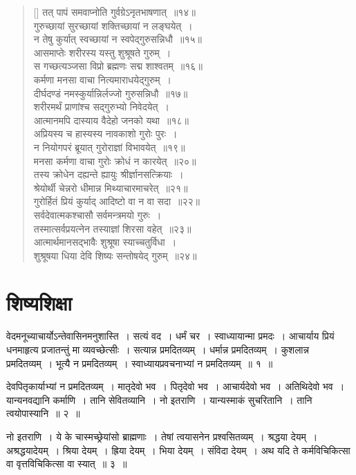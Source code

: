 \documentclass[twoside,12pt,notitlepage]{book}
\begin{document}
\begin{verse}[\versewidth]
तत् पापं समवाप्नोति गुर्वग्रेऽनृतभाषणात्~॥१४॥\\
गुरुच्छायां सुरच्छायां शक्तिच्छायां न लङ्घयेत्~।\\[-6pt]
न तेषु कुर्यात् स्वच्छायां न स्वपेद्गुरुसन्निधौ~॥१५॥\footA \\
आसमाप्तेः शरीरस्य यस्तु शुश्रूषते गुरुम्~।\\[-6pt]
स गच्छत्यञ्जसा विप्रो ब्रह्मणः सद्म शाश्वतम्~॥१६॥\\
कर्मणा मनसा वाचा नित्यमाराधयेद्गुरुम्~।\\[-6pt]
दीर्घदण्डं नमस्कुर्यान्निर्लज्जो गुरुसन्निधौ~॥१७॥\\
शरीरमर्थं प्राणांश्च सद्गुरुभ्यो निवेदयेत्~।\\[-6pt]
आत्मानमपि दास्याय वैदेहो जनको यथा~॥१८॥\\
अप्रियस्य च हास्यस्य नावकाशो गुरोः पुरः~।\\[-6pt]
न नियोगपरं ब्रूयात् गुरोराज्ञां विभावयेत्~॥१९॥\\
मनसा कर्मणा वाचा गुरोः क्रोधं न कारयेत्~॥२०॥\\
तस्य क्रोधेन दह्यन्ते ह्यायुः श्रीर्ज्ञानसत्क्रियाः~।\\[-6pt]
श्रेयोर्थी चेन्नरो धीमान्न मिथ्याचारमाचरेत्~॥२१॥\\
गुरोर्हितं प्रियं कुर्याद् आदिष्टो वा न वा सदा~॥२२॥\\
सर्वदेवात्मकश्चासौ सर्वमन्त्रमयो गुरुः~।\\[-6pt]
तस्मात्सर्वप्रयत्नेन तस्याज्ञां शिरसा वहेत्~॥२३॥\\
आत्मार्थमानसद्भावैः शुश्रूषा स्याच्चतुर्विधा~।\\[-6pt]
शुश्रूषया धिया देवि शिष्यः सन्तोषयेद् गुरुम्~॥२४॥\footA 
\end{verse}

\section{शिष्यशिक्षा}

वेदमनूच्याचार्योऽन्तेवासिनमनुशास्ति~। सत्यं वद~। धर्मं चर~। स्वाध्यायान्मा प्रमदः~। आचार्याय प्रियं धनमाहृत्य प्रजातन्तुं मा व्यवच्छेत्सीः~। सत्यान्न प्रमदितव्यम्~। धर्मान्न प्रमदितव्यम्~। कुशलान्न प्रमदितव्यम्~। भूत्यै न प्रमदितव्यम्~। स्वाध्यायप्रवचनाभ्यां न प्रमदितव्यम्~॥ १~॥ 

देवपितृकार्याभ्यां न प्रमदितव्यम्~। मातृदेवो भव~। पितृदेवो भव~। आचार्यदेवो भव~। अतिथिदेवो भव~। यान्यनवद्यानि कर्माणि~। तानि सेवितव्यानि~। नो इतराणि~। यान्यस्माकं सुचरितानि~। तानि त्वयोपास्यानि~॥ २~॥ 

नो इतराणि~। ये के चास्मच्छ्रेयांसो ब्राह्मणाः~। तेषां त्वयासनेन प्रश्वसितव्यम्~। श्रद्धया देयम्~। अश्रद्धयादेयम्~। श्रिया देयम्~। ह्रिया देयम्~। भिया देयम्~। संविदा देयम्~। अथ यदि ते कर्मविचिकित्सा वा वृत्तविचिकित्सा वा स्यात्~॥ ३~॥ 
\end{document}
